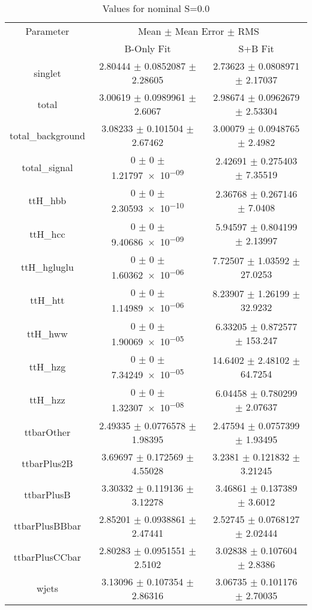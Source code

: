 \begin{table}
\centering
\caption{Values for nominal S=0.0}
\begin{tabular}{ccc}
\toprule
Parameter & \multicolumn{2}{c}{Mean $\pm$ Mean Error $\pm$ RMS}\\
 & B-Only Fit & S+B Fit\\
\midrule
singlet & \num{2.80444} $\pm$ \num{0.0852087} $\pm$ \num{2.28605} & \num{2.73623} $\pm$ \num{0.0808971} $\pm$ \num{2.17037}\\
total & \num{3.00619} $\pm$ \num{0.0989961} $\pm$ \num{2.6067} & \num{2.98674} $\pm$ \num{0.0962679} $\pm$ \num{2.53304}\\
total\_background & \num{3.08233} $\pm$ \num{0.101504} $\pm$ \num{2.67462} & \num{3.00079} $\pm$ \num{0.0948765} $\pm$ \num{2.4982}\\
total\_signal & \num{0} $\pm$ \num{0} $\pm$ \num{1.21797e-09} & \num{2.42691} $\pm$ \num{0.275403} $\pm$ \num{7.35519}\\
ttH\_hbb & \num{0} $\pm$ \num{0} $\pm$ \num{2.30593e-10} & \num{2.36768} $\pm$ \num{0.267146} $\pm$ \num{7.0408}\\
ttH\_hcc & \num{0} $\pm$ \num{0} $\pm$ \num{9.40686e-09} & \num{5.94597} $\pm$ \num{0.804199} $\pm$ \num{2.13997}\\
ttH\_hgluglu & \num{0} $\pm$ \num{0} $\pm$ \num{1.60362e-06} & \num{7.72507} $\pm$ \num{1.03592} $\pm$ \num{27.0253}\\
ttH\_htt & \num{0} $\pm$ \num{0} $\pm$ \num{1.14989e-06} & \num{8.23907} $\pm$ \num{1.26199} $\pm$ \num{32.9232}\\
ttH\_hww & \num{0} $\pm$ \num{0} $\pm$ \num{1.90069e-05} & \num{6.33205} $\pm$ \num{0.872577} $\pm$ \num{153.247}\\
ttH\_hzg & \num{0} $\pm$ \num{0} $\pm$ \num{7.34249e-05} & \num{14.6402} $\pm$ \num{2.48102} $\pm$ \num{64.7254}\\
ttH\_hzz & \num{0} $\pm$ \num{0} $\pm$ \num{1.32307e-08} & \num{6.04458} $\pm$ \num{0.780299} $\pm$ \num{2.07637}\\
ttbarOther & \num{2.49335} $\pm$ \num{0.0776578} $\pm$ \num{1.98395} & \num{2.47594} $\pm$ \num{0.0757399} $\pm$ \num{1.93495}\\
ttbarPlus2B & \num{3.69697} $\pm$ \num{0.172569} $\pm$ \num{4.55028} & \num{3.2381} $\pm$ \num{0.121832} $\pm$ \num{3.21245}\\
ttbarPlusB & \num{3.30332} $\pm$ \num{0.119136} $\pm$ \num{3.12278} & \num{3.46861} $\pm$ \num{0.137389} $\pm$ \num{3.6012}\\
ttbarPlusBBbar & \num{2.85201} $\pm$ \num{0.0938861} $\pm$ \num{2.47441} & \num{2.52745} $\pm$ \num{0.0768127} $\pm$ \num{2.02444}\\
ttbarPlusCCbar & \num{2.80283} $\pm$ \num{0.0951551} $\pm$ \num{2.5102} & \num{3.02838} $\pm$ \num{0.107604} $\pm$ \num{2.8386}\\
wjets & \num{3.13096} $\pm$ \num{0.107354} $\pm$ \num{2.86316} & \num{3.06735} $\pm$ \num{0.101176} $\pm$ \num{2.70035}\\
\bottomrule
\end{tabular}
\end{table}